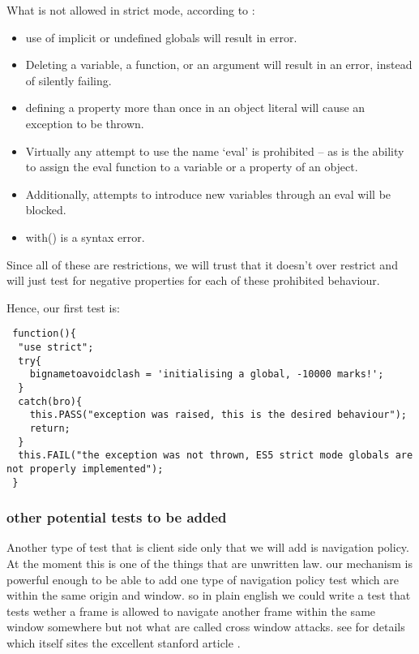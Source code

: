 What is not allowed in strict mode, according to \cite{resig}:
\begin{itemize}
 \item use of implicit or undefined globals will result in error.
 \item Deleting a variable, a function, or an argument will result in an error, instead of silently failing.
 \item defining a property more than once in an object literal will cause an exception to be thrown.
 \item Virtually any attempt to use the name ‘eval’ is prohibited – as is the ability to assign the eval function to a variable or a property of an object.
 \item Additionally, attempts to introduce new variables through an eval will be blocked.
 \item with(){} is a syntax error.
\end{itemize}

Since all of these are restrictions, we will trust that it doesn't over restrict and will just test for negative properties for each of these prohibited behaviour.\

Hence, our first test is:

\begin{verbatim}
 function(){
  "use strict";
  try{
    bignametoavoidclash = 'initialising a global, -10000 marks!';
  }
  catch(bro){
    this.PASS("exception was raised, this is the desired behaviour");
    return;
  }
  this.FAIL("the exception was not thrown, ES5 strict mode globals are not properly implemented");
 }
\end{verbatim}

\subsubsection{other potential tests to be added}

Another type of test that is client side only that we will add is navigation policy. At the moment this is one of the things
that are unwritten law. our mechanism is powerful enough to be able to add one type of navigation policy test which are
within the same origin and window. so in plain english we could write a test that tests wether a frame is allowed
to navigate another frame within the same window somewhere but not what are called cross window attacks. 
see \cite{infosys} for details which itself sites the excellent stanford article \cite{stanford}.

